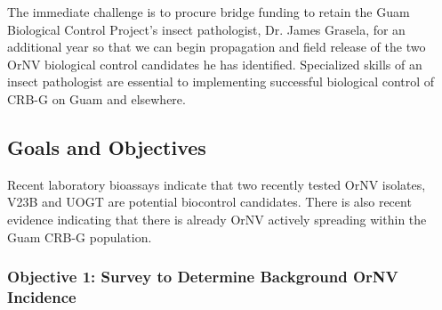 \documentclass[12pt,letterpaper,english,bibliography=totocnumbered, abstract=on]{scrartcl}
\begin{document}
The immediate challenge is to procure bridge funding to retain the Guam Biological Control Project's insect pathologist, Dr. James Grasela, for an additional year so that we can begin propagation and field release of the two OrNV biological control candidates he has identified. Specialized skills of an insect pathologist are essential to implementing successful biological control of CRB-G on Guam and elsewhere.

%
%

\subsection{Goals and Objectives}

Recent laboratory bioassays indicate that two recently tested OrNV isolates, V23B and UOGT are potential biocontrol candidates. There is also recent evidence indicating that there is already OrNV actively spreading within the Guam CRB-G population.

\subsubsection{Objective 1: Survey to Determine Background OrNV Incidence} 
\end{document}
